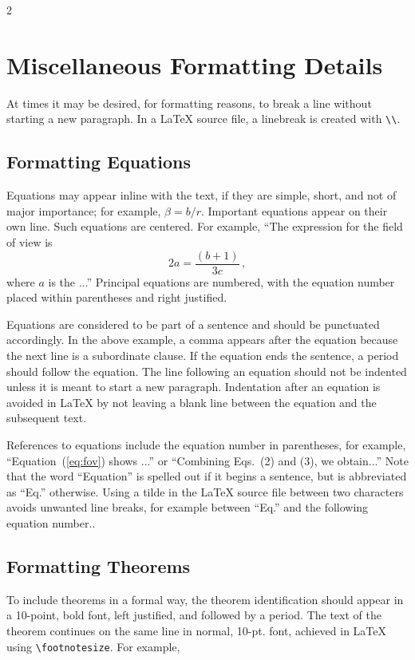 \documentclass[12pt]{spieman}  %
\begin{document}
\begin{spacing}{2}
\appendix    %

\section{Miscellaneous Formatting Details}
\label{sect:misc}
At times it may be desired, for formatting reasons, to break a line without starting a new paragraph. In a LaTeX source file, a linebreak is created with \verb|\\|.


\subsection{Formatting Equations}
Equations may appear inline with the text, if they are simple, short, and not of major importance; for example, $\beta = b/r$.  Important equations appear on their own line.  Such equations are centered.  For example, ``The expression for the field of view is
\begin{equation}
\label{eq:fov}
2 a = \frac{(b + 1)}{3c} \, ,
\end{equation}
where $a$ is the ...''  Principal equations are numbered, with the equation number placed within parentheses and right justified.  

Equations are considered to be part of a sentence and should be punctuated accordingly. In the above example, a comma appears after the equation because the next line is a subordinate clause. If the equation ends the sentence, a period should follow the equation. The line following an equation should not be indented unless it is meant to start a new paragraph. Indentation after an equation is avoided in LaTeX by not leaving a blank line between the equation and the subsequent text.

References to equations include the equation number in parentheses, for example, ``Equation~(\ref{eq:fov}) shows ...'' or ``Combining Eqs.~(2) and (3), we obtain...'' Note that the word ``Equation'' is spelled out if it begins a sentence, but is abbreviated as ``Eq.'' otherwise. Using a tilde in the LaTeX source file between two characters avoids unwanted line breaks, for example between ``Eq.'' and the following equation number..

\subsection{Formatting Theorems}

To include theorems in a formal way, the theorem identification should appear in a 10-point, bold font, left justified, and followed by a period.  The text of the theorem continues on the same line in normal, 10-pt. font, achieved in LaTeX using \verb|\footnotesize|.  For example, 


\end{spacing}
\end{document}

